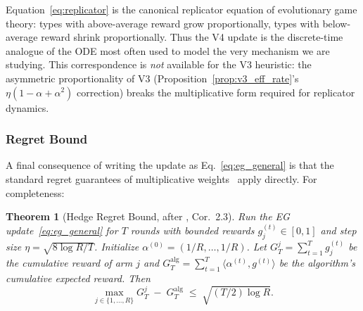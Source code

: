 \documentclass[11pt,a4paper]{article}
\theoremstyle{definition}
\theoremstyle{plain}
\newtheorem{theorem}{Theorem}[section]
\begin{document}
\noindent Equation~\eqref{eq:replicator} is the canonical replicator
equation of evolutionary game theory: types with above-average reward
grow proportionally, types with below-average reward shrink
proportionally. Thus the V4 update is the discrete-time analogue of the
ODE most often used to model the very mechanism we are studying. This
correspondence is \emph{not} available for the V3 heuristic: the
asymmetric proportionality of V3
(Proposition~\ref{prop:v3_eff_rate}'s $\eta(1-\alpha+\alpha^2)$
correction) breaks the multiplicative form required for replicator
dynamics.

\subsubsection*{Regret Bound}

A final consequence of writing the update as Eq.~\eqref{eq:eg_general}
is that the standard regret guarantees of multiplicative
weights~\cite{freund1997decision, arora2012multiplicative} apply
directly. For completeness:

\begin{theorem}[Hedge Regret Bound, after \cite{cesa2006prediction}, Cor.~2.3]
\label{thm:eg_regret}
Run the EG update~\eqref{eq:eg_general} for $T$ rounds with bounded
rewards $g_j^{(t)} \in [0, 1]$ and step size $\eta = \sqrt{8\log R / T}$.
Initialize $\alpha^{(0)} = (1/R, \ldots, 1/R)$. Let
$G_T^j = \sum_{t=1}^{T} g_j^{(t)}$ be the cumulative reward of arm $j$
and $G_T^{\mathrm{alg}} = \sum_{t=1}^{T} \langle \alpha^{(t)}, g^{(t)} \rangle$
be the algorithm's cumulative expected reward. Then
\begin{equation}
\max_{j \in \{1,\ldots,R\}} G_T^j \;-\; G_T^{\mathrm{alg}}
\;\leq\; \sqrt{(T/2) \log R}.
\end{equation}
\end{theorem}
\end{document}
